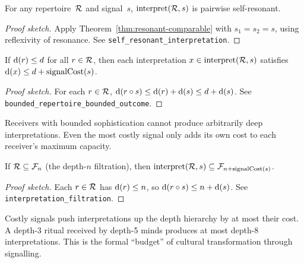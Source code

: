 \begin{theorem}
\label{thm:self-resonant-interp}
For any repertoire~$\mathcal{R}$ and signal~$s$,
$\operatorname{interpret}(\mathcal{R}, s)$ is pairwise self-resonant.
\end{theorem}

\begin{proof}[Proof sketch]
Apply Theorem~\ref{thm:resonant-comparable} with $s_1 = s_2 = s$,
using reflexivity of resonance.
See \texttt{self\_resonant\_interpretation}.
\end{proof}

\begin{theorem}
\label{thm:bounded-repertoire}
If $\operatorname{d}(r) \leq d$ for all $r \in \mathcal{R}$, then each interpretation
$x \in \operatorname{interpret}(\mathcal{R}, s)$ satisfies
$\operatorname{d}(x) \leq d + \operatorname{signalCost}(s)$.
\end{theorem}

\begin{proof}[Proof sketch]
For each $r \in \mathcal{R}$,
$\operatorname{d}(r \circ s) \leq \operatorname{d}(r) + \operatorname{d}(s) \leq d + \operatorname{d}(s)$.
See \texttt{bounded\_repertoire\_bounded\_outcome}.
\end{proof}

\begin{remark}
Receivers with bounded sophistication cannot produce arbitrarily deep
interpretations.  Even the most costly signal only adds its own cost to
each receiver's maximum capacity.
\end{remark}

\begin{theorem}
\label{thm:interp-filtration}
If $\mathcal{R} \subseteq \mathcal{F}_n$ (the depth-$n$ filtration), then
$\operatorname{interpret}(\mathcal{R}, s) \subseteq
 \mathcal{F}_{n + \operatorname{signalCost}(s)}$.
\end{theorem}

\begin{proof}[Proof sketch]
Each $r \in \mathcal{R}$ has $\operatorname{d}(r) \leq n$, so
$\operatorname{d}(r \circ s) \leq n + \operatorname{d}(s)$.
See \texttt{interpretation\_filtration}.
\end{proof}

\begin{remark}
Costly signals push interpretations up the depth hierarchy by at most
their cost.  A depth-3 ritual received by depth-5 minds produces at most
depth-8 interpretations.  This is the formal ``budget'' of cultural
transformation through signalling.
\end{remark}

